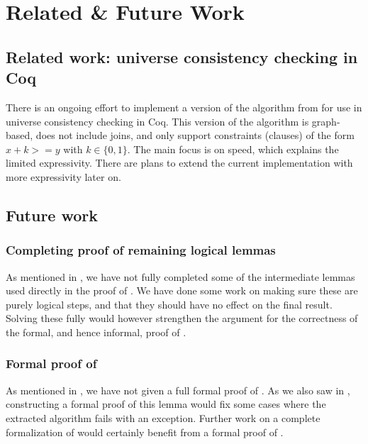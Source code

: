 \chapter{Related \& Future Work}

\section{Related work: universe consistency checking in Coq}

There is an ongoing effort \cite{coqgithub} to implement a version of the algorithm from \cite{mbezem}
for use in universe consistency checking in Coq.
This version of the algorithm is graph-based, does not include joins,
and only support constraints (clauses) of the form $x + k >= y$ with $k \in \{0, 1\}$.
The main focus is on speed, which explains the limited expressivity.
There are plans to extend the current implementation with more expressivity later on.

\section{Future work}

\subsection{Completing proof of remaining logical lemmas}

As mentioned in , we have not fully completed
some of the intermediate lemmas used directly in the proof of .
We have done some work on making sure these are purely logical steps,
and that they should have no effect on the final result.
Solving these fully would however strengthen the argument for the correctness of the formal,
and hence informal, proof of .

\subsection{Formal proof of }

As mentioned in , we have not given a full formal proof
of . As we also saw in , constructing a formal proof of this lemma
would fix some cases where the extracted algorithm fails with an exception.
Further work on a complete formalization of  would certainly benefit from a formal proof of .


